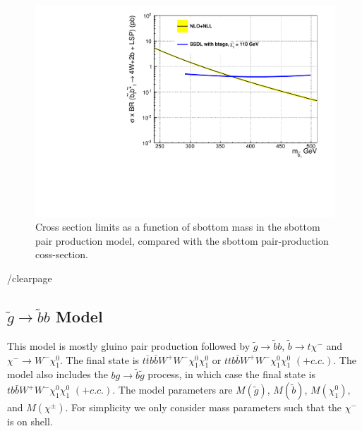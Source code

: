 
\begin{figure}[htb]
\begin{center}
\includegraphics[width=0.49\linewidth]{figs/sbottom_1d.pdf}
\caption{Cross section limits as a function of sbottom mass
in the sbottom pair production model, compared with the 
sbottom pair-production coss-section.
\label{fig:sbottomLimit1d}}
\end{center}
\end{figure}

/clearpage






\subsection{$\widetilde{g} \to \widetilde{b}b$ Model}
\label{sec:gbb}
This model is mostly gluino pair production followed by 
$\widetilde{g} \to \widetilde{b}b$, $\widetilde{b} \to t \chi^{-}$ and
$\chi^{-} \to W^- \chi_1^0$. 
The final state is $t\bar{t}b\bar{b}W^+W^- \chi_1^0 \chi_1^0$
or $ttb\bar{b}W^+W^- \chi_1^0 \chi_1^0$ $(+ c.c.)$.
The model also includes the $b g \to \widetilde{b} \widetilde{g}$ process,
in which case the final state is
$tb\bar{b}W^+W^- \chi_1^0 \chi_1^0$ $(+ c.c.)$. 
The model parameters are $M(\widetilde{g})$,
$M(\widetilde{b})$, $M(\chi_1^0)$, and $M(\chi^{\pm})$.
For simplicity we only consider mass parameters such that the 
$\chi^{-}$ is on shell. 

